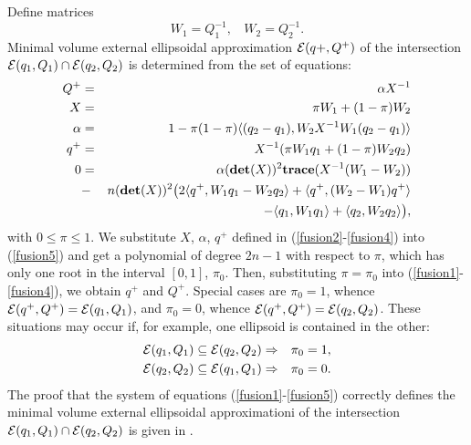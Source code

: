 Define matrices
\begin{equation}
W_1 = Q_1^{-1}, ~~~~ W_2 = Q_2^{-1} .\label{wmatrices}
\end{equation}
Minimal volume external ellipsoidal approximation $\EE(q+,Q^+)$ of
the intersection $\EE(q_1,Q_1)\cap\EE(q_2,Q_2)$ is determined from the set
of equations:
\begin{eqnarray}
Q^+ & = & \alpha X^{-1} \label{fusion1} \\
X & = & \pi W_1 + (1-\pi)W_2 \label{fusion2} \\
\alpha & = & 1-\pi(1-\pi)\langle(q_2-q_1), W_2X^{-1}W_1(q_2-q_1)\rangle
\label{fusion3} \\
q^+ & = & X^{-1}(\pi W_1q_1 + (1-\pi)W_2q_2) \label{fusion4} \\
0 & = & \alpha({\bf det}(X))^2{\bf trace}(X^{-1}(W_1-W_2)) \nonumber \\
& - & n({\bf det}(X))^2
\big{(}2\langle q^+,W_1q_1-W_2q_2\rangle +
\langle q^+,(W_2-W_1)q^+\rangle \nonumber\\
&  & - \langle q_1,W_1q_1\rangle +
\langle q_2,W_2q_2\rangle\big{)}, \label{fusion5}
\end{eqnarray}
with $0\leq\pi\leq1$. We substitute $X$, $\alpha$, $q^+$ defined in
(\ref{fusion2}-\ref{fusion4}) into (\ref{fusion5}) and get a polynomial of
degree $2n-1$ with respect to $\pi$, which has only one root in the
interval $[0,1]$, $\pi_0$. Then, substituting $\pi=\pi_0$ into
(\ref{fusion1}-\ref{fusion4}), we obtain $q^+$ and $Q^+$.
Special cases are $\pi_0=1$, whence $\EE(q^+,Q^+)=\EE(q_1,Q_1)$, and
$\pi_0=0$, whence $\EE(q^+,Q^+)=\EE(q_2,Q_2)$. These situations may occur
if, for example, one ellipsoid is contained in the other:
\begin{eqnarray*}
\EE(q_1,Q_1)\subseteq\EE(q_2,Q_2) & \Rightarrow & \pi_0 = 1,\\
\EE(q_2,Q_2)\subseteq\EE(q_1,Q_1) & \Rightarrow & \pi_0 = 0.\\
\end{eqnarray*}
The proof that the system of equations (\ref{fusion1}-\ref{fusion5})
correctly defines the minimal volume external ellipsoidal approximationi
of the intersection $\EE(q_1,Q_1)\cap\EE(q_2,Q_2)$ is given in \cite{fusion}.

